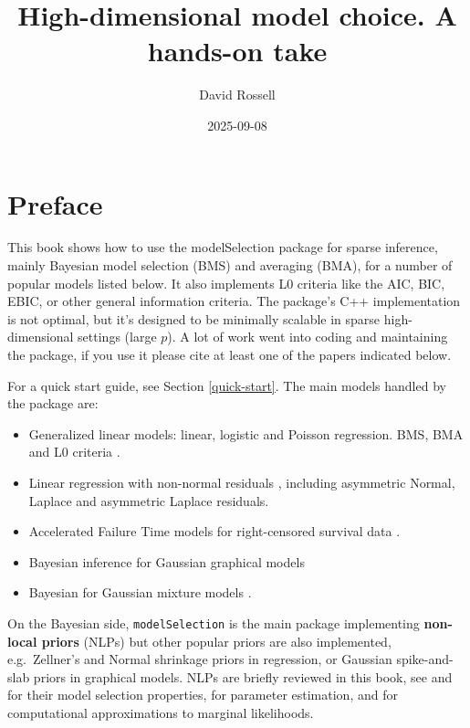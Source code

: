 \documentclass[
]{book}
\title{High-dimensional model choice. A hands-on take}
\author{David Rossell}
\date{2025-09-08}
\theoremstyle{definition}
\theoremstyle{definition}
\theoremstyle{definition}
\theoremstyle{definition}
\theoremstyle{remark}
\begin{document}
\maketitle

{
\setcounter{tocdepth}{1}
\tableofcontents
}
\chapter*{Preface}\label{preface}

This book shows how to use the modelSelection package
for sparse inference, mainly Bayesian model selection (BMS) and averaging (BMA), for a number of popular models listed below. It also implements L0 criteria like the AIC, BIC, EBIC, or other general information criteria.
The package's C++ implementation is not optimal, but it's designed to be minimally scalable in sparse high-dimensional settings (large \(p\)).
A lot of work went into coding and maintaining the package, if you use it please cite at least one of the papers indicated below.

For a quick start guide, see Section \ref{quick-start}. The main models handled by the package are:

\begin{itemize}
\item
  Generalized linear models: linear, logistic and Poisson regression. BMS, BMA and L0 criteria \citep{johnson:2012, rossell:2017, rossell:2021}.
\item
  Linear regression with non-normal residuals \citep{rossell:2018b}, including asymmetric Normal, Laplace and asymmetric Laplace residuals.
\item
  Accelerated Failure Time models for right-censored survival data \citep{rossell:2021b}.
\item
  Bayesian inference for Gaussian graphical models
\item
  Bayesian for Gaussian mixture models \citep{fuquene:2019}.
\end{itemize}

On the Bayesian side, \texttt{modelSelection} is the main package implementing \textbf{non-local priors} (NLPs) but other popular priors are also implemented, e.g.~Zellner's and Normal shrinkage priors in regression, or Gaussian spike-and-slab priors in graphical models.
NLPs are briefly reviewed in this book, see \citet{johnson:2010} and \citet{johnson:2012} for their model selection properties,
\citet{rossell:2017} for parameter estimation,
and \citet{rossell:2021} for computational approximations to marginal likelihoods.
\end{document}
